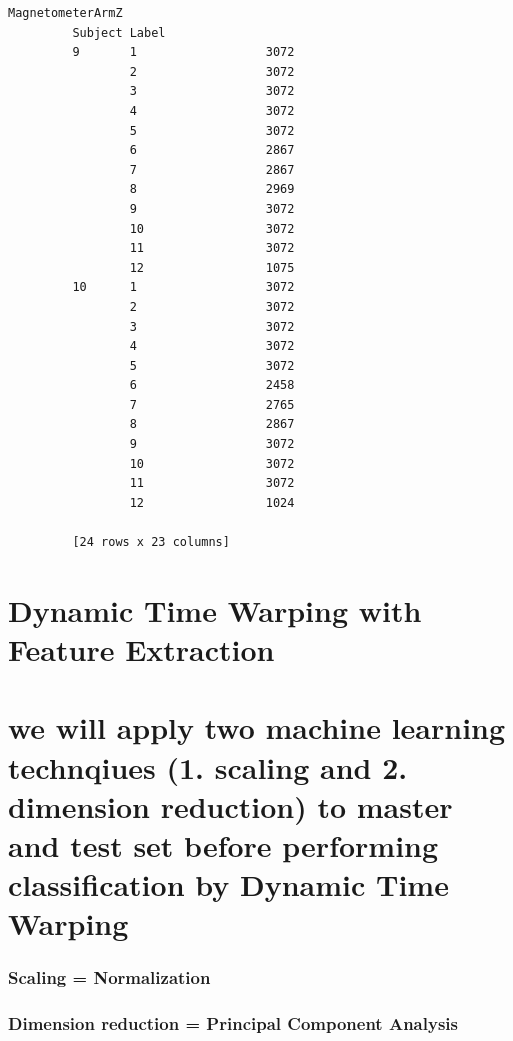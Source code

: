 \documentclass[11pt]{article}
\begin{document}
\begin{Verbatim}[commandchars=\\\{\}]
                        MagnetometerArmZ  
         Subject Label                    
         9       1                  3072  
                 2                  3072  
                 3                  3072  
                 4                  3072  
                 5                  3072  
                 6                  2867  
                 7                  2867  
                 8                  2969  
                 9                  3072  
                 10                 3072  
                 11                 3072  
                 12                 1075  
         10      1                  3072  
                 2                  3072  
                 3                  3072  
                 4                  3072  
                 5                  3072  
                 6                  2458  
                 7                  2765  
                 8                  2867  
                 9                  3072  
                 10                 3072  
                 11                 3072  
                 12                 1024  
         
         [24 rows x 23 columns]
\end{Verbatim}
            
    \section{Dynamic Time Warping with Feature
Extraction}\label{dynamic-time-warping-with-feature-extraction}

    \section{we will apply two machine learning technqiues (1. scaling and
2. dimension reduction) to master and test set before performing
classification by Dynamic Time
Warping}\label{we-will-apply-two-machine-learning-technqiues-1.-scaling-and-2.-dimension-reduction-to-master-and-test-set-before-performing-classification-by-dynamic-time-warping}

\subsubsection{Scaling = Normalization}\label{scaling-normalization}

\subsubsection{Dimension reduction = Principal Component
Analysis}\label{dimension-reduction-principal-component-analysis}
\end{document}
